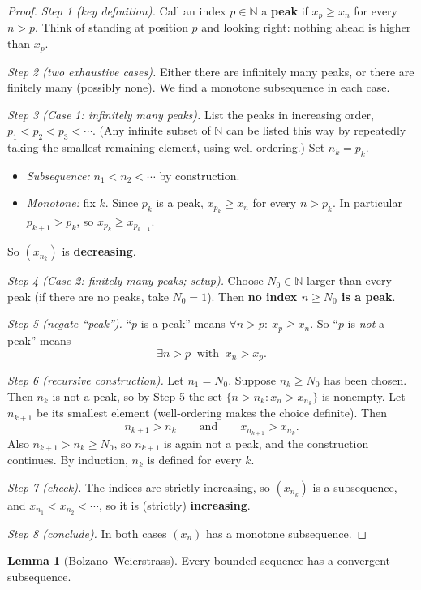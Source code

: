 \documentclass[11pt]{article}
\theoremstyle{definition}
\newtheorem{lem}[defn]{Lemma}
\newcommand{\N}{\mathbb{N}}
\newcommand{\key}[1]{\textcolor{red!70!black}{\textbf{#1}}}
\begin{document}
\begin{proof}
\emph{Step 1 (key definition).} Call an index $p\in\N$ a \textbf{peak} if
$x_p\ge x_n$ for every $n>p$. Think of standing at position $p$ and
looking right: nothing ahead is higher than $x_p$.

\emph{Step 2 (two exhaustive cases).} Either there are infinitely many
peaks, or there are finitely many (possibly none). We find a monotone
subsequence in each case.

\emph{Step 3 (Case 1: infinitely many peaks).} List the peaks in
increasing order, $p_1<p_2<p_3<\cdots$. (Any infinite subset of $\N$ can
be listed this way by repeatedly taking the smallest remaining element,
using well-ordering.) Set $n_k=p_k$.
\begin{itemize}[nosep]
  \item \emph{Subsequence:} $n_1<n_2<\cdots$ by construction.
  \item \emph{Monotone:} fix $k$. Since $p_k$ is a peak, $x_{p_k}\ge x_n$
        for every $n>p_k$. In particular $p_{k+1}>p_k$, so
        $x_{p_k}\ge x_{p_{k+1}}$.
\end{itemize}
So $(x_{n_k})$ is \textbf{decreasing}.

\emph{Step 4 (Case 2: finitely many peaks; setup).} Choose $N_0\in\N$
larger than every peak (if there are no peaks, take $N_0=1$). Then
\key{no index $n\ge N_0$ is a peak}.

\emph{Step 5 (negate ``peak'').} ``$p$ is a peak'' means
$\forall n>p:\ x_p\ge x_n$. So ``$p$ is \emph{not} a peak'' means
\[
\exists n>p\ \text{ with }\ x_n>x_p.
\]

\emph{Step 6 (recursive construction).} Let $n_1=N_0$. Suppose
$n_k\ge N_0$ has been chosen. Then $n_k$ is not a peak, so by Step 5 the
set $\{n>n_k: x_n>x_{n_k}\}$ is nonempty. Let $n_{k+1}$ be its smallest
element (well-ordering makes the choice definite). Then
\[
n_{k+1}>n_k\qquad\text{and}\qquad x_{n_{k+1}}>x_{n_k}.
\]
Also $n_{k+1}>n_k\ge N_0$, so $n_{k+1}$ is again not a peak, and the
construction continues. By induction, $n_k$ is defined for every $k$.

\emph{Step 7 (check).} The indices are strictly increasing, so
$(x_{n_k})$ is a subsequence, and $x_{n_1}<x_{n_2}<\cdots$, so it is
(strictly) \textbf{increasing}.

\emph{Step 8 (conclude).} In both cases $(x_n)$ has a monotone
subsequence.
\end{proof}

\begin{lem}[Bolzano--Weierstrass]\label{lem:bw}
Every bounded sequence has a convergent subsequence.
\end{lem}
\end{document}
